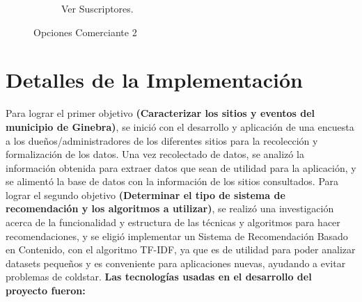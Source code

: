 \documentclass[12pt,letterpaper,openany]{book}
\begin{document}
\begin{figure}[H]
\begin{subfigure}{.4\linewidth}
        \caption{Ver Suscriptores.}
    \end{subfigure}
    \caption{Opciones Comerciante 2}
\end{figure}

\section{Detalles de la Implementación}
Para lograr el primer objetivo \textbf{(Caracterizar los sitios y eventos del municipio de Ginebra)}, se inició con el desarrollo y aplicación de una encuesta a los dueños/administradores de los diferentes sitios para la recolección y formalización de los datos.
Una vez recolectado de datos, se analizó la información obtenida para extraer datos que sean de utilidad para la aplicación, y se alimentó la base de datos con la información de los sitios consultados.
\vspace{5mm}\newline
Para lograr el segundo objetivo \textbf{(Determinar el tipo de sistema de recomendación y los algoritmos a utilizar)}, se realizó una investigación acerca de la funcionalidad y estructura de las técnicas y algoritmos para hacer recomendaciones, y se eligió implementar un Sistema de Recomendación Basado en Contenido, con el algoritmo TF-IDF, ya que es de utilidad para poder analizar datasets pequeños y es conveniente para aplicaciones nuevas, ayudando a evitar problemas de coldstar.
\vspace{5mm}\newline
\textbf{Las tecnologías usadas en el desarrollo del proyecto fueron:}
\end{document}
